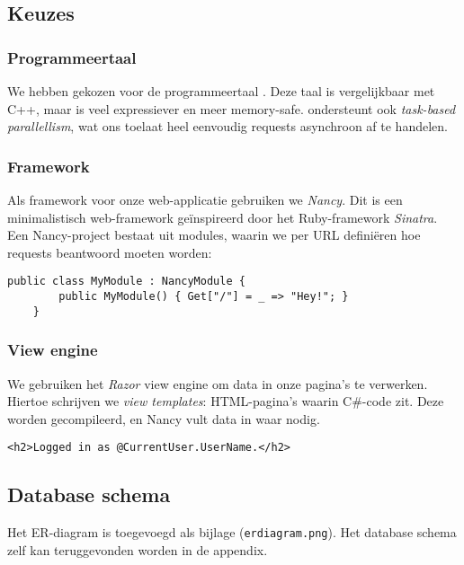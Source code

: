 \documentclass[12pt,draft,parskip=full]{article}
\begin{document}
\subsection{Keuzes}
\subsubsection{Programmeertaal}
We hebben gekozen voor de programmeertaal \CS{}. Deze taal is vergelijkbaar met
C++, maar is veel expressiever en meer memory-safe. \CS{} ondersteunt ook 
\textit{task-based parallellism}, wat ons toelaat heel eenvoudig requests 
asynchroon af te handelen.

\subsubsection{Framework}
Als framework voor onze web-applicatie gebruiken we \textit{Nancy}. Dit is een 
minimalistisch web-framework ge\"inspireerd door het Ruby-framework 
\textit{Sinatra}. Een Nancy-project bestaat uit modules, waarin we per URL 
defini\"eren hoe requests beantwoord moeten worden:

\begin{lstlisting}[caption=Een \textit{hello world}-applicatie in Nancy]
    public class MyModule : NancyModule {
        public MyModule() { Get["/"] = _ => "Hey!"; }
    }
\end{lstlisting}

\subsubsection{View engine}
We gebruiken het \textit{Razor} view engine om data in onze pagina's te 
verwerken. Hiertoe schrijven we \textit{view templates}: HTML-pagina's waarin 
C\#-code zit. Deze worden gecompileerd, en Nancy vult data in waar nodig.

\lstset{language=HTML}
\begin{lstlisting}[caption=Een simpel voorbeeld van een Razor view, label=razor]
    <h2>Logged in as @CurrentUser.UserName.</h2>
\end{lstlisting}

\subsection{Database schema}
Het ER-diagram is toegevoegd als bijlage (\texttt{erdiagram.png}). Het database schema zelf kan teruggevonden worden in de appendix.
\end{document}
